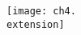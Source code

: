 \documentclass{article}
\newcommand{\extension}{44}  %
\begin{document}
\texttt{[image: ch4.\\extension]}
\end{document}
